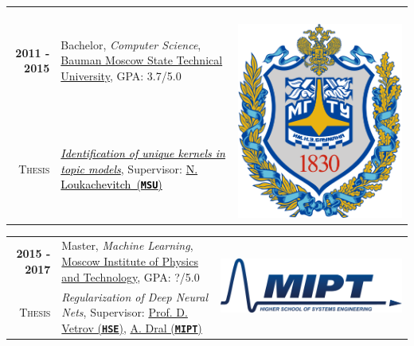 \documentclass[a4paper,10pt]{article} %
\begin{document}
\begin{tabular}{rp{14cm}c}	
\textbf{2011 -  2015} & Bachelor, \emph{Computer Science}, \href{http://www.bmstu.ru/en/}{Bauman Moscow State Technical University}, GPA: 3.7/5.0 & \multirow{2}{*}{~~~~~\includegraphics[scale=0.012]{img/bmstu}}\\
\textsc{Thesis} &\emph{\href{http://istina.msu.ru/diplomas/10296104/}{\textcolor{black}{Identification of unique kernels in topic models}}}, Supervisor:  \href{http://istina.msu.ru/profile/louk_nat/}{\textcolor{black}{N. Loukachevitch~(\texttt{\textbf{MSU}})}}
\end{tabular}

\begin{tabular}{rp{14cm}c}	
\textbf{2015 -  2017} & Master, \emph{Machine Learning}, \href{https://mipt.ru/english}{Moscow Institute of Physics and Technology}, GPA: ?/5.0& \multirow{2}{*}{\includegraphics[scale=0.15]{img/mipt}}\\
\textsc{Thesis} & \emph{Regularization of Deep Neural Nets}, Supervisor: \href{https://www.hse.ru/staff/dvetrov}{Prof. D. Vetrov (\texttt{\textbf{HSE}})}, \href{https://ru.linkedin.com/in/alexey-dr-4a466634}{A. Dral (\texttt{\textbf{MIPT}})}
\end{tabular}
\end{document}
